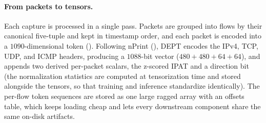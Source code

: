 \paragraph{From packets to tensors.}
Each capture is processed in a single pass. Packets are grouped into flows by their
canonical five-tuple and kept in timestamp order, and each packet is encoded
into a $1090$-dimensional token (). Following nPrint
(), DEPT encodes the IPv4, TCP, \ac{UDP}, and ICMP headers,
producing a $1088$-bit vector ($480 + 480 + 64 + 64$), and appends two derived
per-packet scalars, the z-scored \ac{IPAT} and a direction bit (the normalization
statistics are computed at tensorization time and stored alongside the tensors, so that
training and inference standardize identically). The per-flow token sequences are
stored as one large ragged array with an offsets table, which keeps loading cheap and
lets every downstream component share the same on-disk artifacts.

